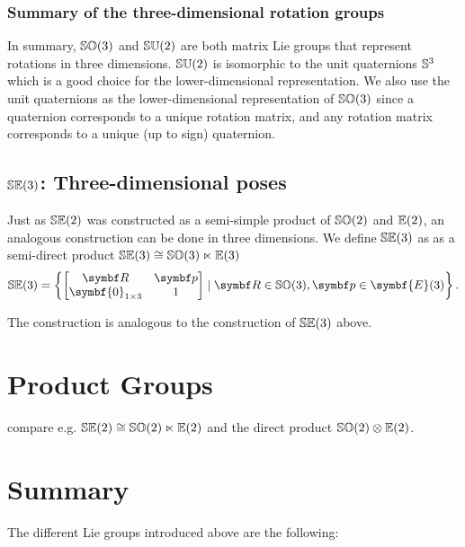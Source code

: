 \subsubsection{Summary of the three-dimensional rotation groups}

In summary, ${\mathbb{SO}(3)}$ and ${\mathbb{SU}(2)}$ are both matrix Lie groups that represent rotations in three dimensions. ${\mathbb{SU}(2)}$ is isomorphic to the unit quaternions ${\mathbb{S}^3}$ which is a good choice for the lower-dimensional representation. We also use the unit quaternions as the lower-dimensional representation of ${\mathbb{SO}(3)}$ since a quaternion corresponds to a unique rotation matrix, and any rotation matrix corresponds to a unique (up to sign) quaternion.

\subsection{\texorpdfstring{${\mathbb{SE}(3)}$}{S(3)}: Three-dimensional poses}

Just as ${\mathbb{SE}(2)}$ was constructed as a semi-simple product of ${\mathbb{SO}(2)}$ and ${\mathbb{E}(2)}$, an analogous construction can be done in three dimensions. We define ${\mathbb{SE}(3)}$ as as a semi-direct product ${\mathbb{SE}(3)} \cong {\mathbb{SO}(3)} \ltimes \mathbb{E}(3)$
\begin{equation}
  \label{eq:se3_matrix}
  \SEthree = \left\{ \begin{bmatrix} \bR & \bp \\ \symbf{0}_{1 \times 3} & 1 \end{bmatrix} \mid \bR \in \SOthree, \bp \in \symbf{E}(3) \right\}.
\end{equation}

The construction is analogous to the construction of ${\mathbb{SE}(3)}$ above.


\section{Product Groups}


compare e.g. ${\mathbb{SE}(2)} \cong {\mathbb{SO}(2)} \ltimes {\mathbb{E}(2)}$ and the direct product ${\mathbb{SO}(2)} \otimes {\mathbb{E}(2)}$.



\section{Summary}

The different Lie groups introduced above are the following:

